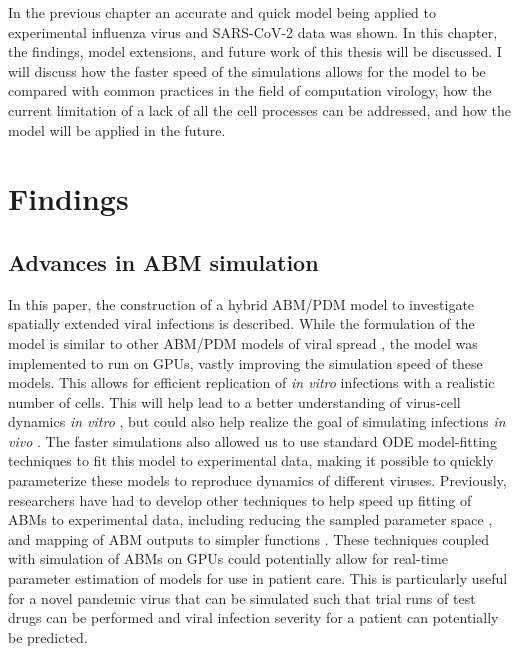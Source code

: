 
In the previous chapter an accurate and quick model being applied to experimental influenza virus and SARS-CoV-2 data was shown. In this chapter, the findings, model extensions, and future work of this thesis will be discussed. I will discuss how the faster speed of the simulations allows for the model to be compared with common practices in the field of computation virology, how the current limitation of a lack of all the cell processes can be addressed, and how the model will be applied in the future.

\section{Findings} \label{findings}

\subsection{Advances in ABM simulation}

In this paper, the construction of a hybrid ABM/PDM model to investigate spatially extended viral infections is described. While the formulation of the model is similar to other ABM/PDM models of viral spread \citep{beauchemin_simple_2005, bauer_agent-based_2009}, the model was implemented to run on GPUs, vastly improving the simulation speed of these models. This allows for efficient replication of \emph{in vitro} infections with a realistic number of cells. This will help lead to a better understanding of virus-cell dynamics \emph{in vitro} \citep{blahut21}, but could also help realize the goal of simulating infections \emph{in vivo} \citep{laubenbacher21}. The faster simulations also allowed us to use standard ODE model-fitting techniques to fit this model to experimental data, making it possible to quickly parameterize these models to reproduce dynamics of different viruses. Previously, researchers have had to develop other techniques to help speed up fitting of ABMs to experimental data, including reducing the sampled parameter space \citep{li17}, and mapping of ABM outputs to simpler functions \citep{tong_development_2015, read16}. These techniques coupled with simulation of ABMs on GPUs could potentially allow for real-time parameter estimation of models for use in patient care. This is particularly useful for a novel pandemic virus that can be simulated such that trial runs of test drugs can be performed and viral infection severity for a patient can potentially be predicted.


